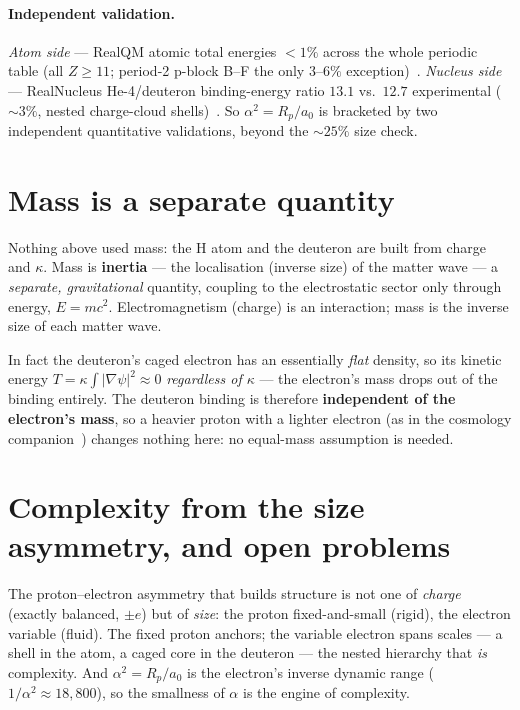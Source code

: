 \documentclass[11pt]{article}
\newcommand{\grad}{\nabla}
\begin{document}
\paragraph{Independent validation.} \emph{Atom side} --- RealQM atomic total energies $<1\%$ across the whole
periodic table (all $Z\ge11$; period-2 p-block B--F the only $3$--$6\%$ exception)~\cite{atoms}.
\emph{Nucleus side} --- RealNucleus He-4/deuteron binding-energy ratio $13.1$ vs.\ $12.7$ experimental
(${\sim}3\%$, nested charge-cloud shells)~\cite{realnucleus}. So $\alpha^2=R_p/a_0$ is bracketed by two
independent quantitative validations, beyond the ${\sim}25\%$ size check.

\section{Mass is a separate quantity}\label{sec:mass}
Nothing above used mass: the H atom and the deuteron are built from charge and $\kappa$. Mass is
\textbf{inertia} --- the localisation (inverse size) of the matter wave --- a \emph{separate, gravitational}
quantity, coupling to the electrostatic sector only through energy, $E=mc^2$. Electromagnetism (charge) is an
interaction; mass is the inverse size of each matter wave.

In fact the deuteron's caged electron has an essentially \emph{flat} density, so its kinetic energy
$T=\kappa\!\int|\grad\psi|^2\approx0$ \emph{regardless of $\kappa$} --- the electron's mass drops out of the
binding entirely. The deuteron binding is therefore \textbf{independent of the electron's mass}, so a heavier
proton with a lighter electron (as in the cosmology companion~\cite{realcos}) changes nothing here: no
equal-mass assumption is needed.

\section{Complexity from the size asymmetry, and open problems}\label{sec:open}
The proton--electron asymmetry that builds structure is not one of \emph{charge} (exactly balanced, $\pm e$)
but of \emph{size}: the proton fixed-and-small (rigid), the electron variable (fluid). The fixed proton
anchors; the variable electron spans scales --- a shell in the atom, a caged core in the deuteron --- the
nested hierarchy that \emph{is} complexity. And $\alpha^2=R_p/a_0$ is the electron's inverse dynamic range
($1/\alpha^2\approx18{,}800$), so the smallness of $\alpha$ is the engine of complexity.
\end{document}
